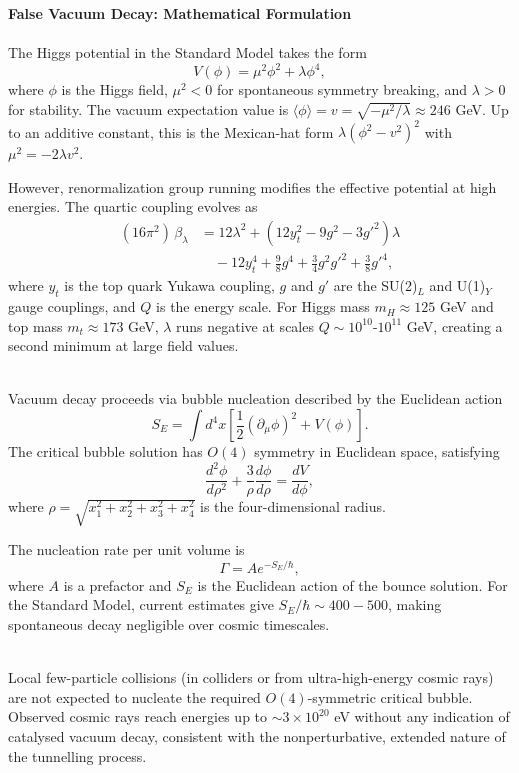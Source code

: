 \begin{technical}
{\Large\textbf{False Vacuum Decay: Mathematical Formulation}}\\[0.3em]

\\[0.5em]
The Higgs potential in the Standard Model takes the form
$$
V(\phi) = \mu^2 \phi^2 + \lambda \phi^4,
$$
where $\phi$ is the Higgs field, $\mu^2 < 0$ for spontaneous symmetry breaking, and $\lambda > 0$ for stability. The vacuum expectation value is $\langle \phi \rangle = v = \sqrt{-\mu^2/\lambda} \approx 246$ GeV. Up to an additive constant, this is the Mexican-hat form $\lambda(\phi^2 - v^2)^2$ with $\mu^2 = -2\lambda v^2$.

However, renormalization group running modifies the effective potential at high energies. The quartic coupling evolves as
\begin{align*}
(16\pi^2)\,\beta_\lambda &= 12\lambda^2 + (12 y_t^2 - 9 g^2 - 3 g'^2)\lambda \\
&\quad - 12 y_t^4 + \frac{9}{8} g^4 + \frac{3}{4} g^2 g'^2 + \frac{3}{8} g'^4,
\end{align*}
where $y_t$ is the top quark Yukawa coupling, $g$ and $g'$ are the SU(2)$ _L$ and U(1)$ _Y$ gauge couplings, and $Q$ is the energy scale. For Higgs mass $m_H \approx 125$ GeV and top mass $m_t \approx 173$ GeV, $\lambda$ runs negative at scales $Q \sim 10^{10}$-$10^{11}$ GeV, creating a second minimum at large field values.

\\[0.5em]
Vacuum decay proceeds via bubble nucleation described by the Euclidean action
$$
S_E = \int d^4x \left[\frac{1}{2}(\partial_\mu \phi)^2 + V(\phi)\right].
$$
The critical bubble solution has $O(4)$ symmetry in Euclidean space, satisfying
$$
\frac{d^2\phi}{d\rho^2} + \frac{3}{\rho}\frac{d\phi}{d\rho} = \frac{dV}{d\phi},
$$
where $\rho = \sqrt{x_1^2 + x_2^2 + x_3^2 + x_4^2}$ is the four-dimensional radius.

The nucleation rate per unit volume is
$$
\Gamma = A e^{-S_E/\hbar},
$$
where $A$ is a prefactor and $S_E$ is the Euclidean action of the bounce solution. For the Standard Model, current estimates give $S_E/\hbar \sim 400-500$, making spontaneous decay negligible over cosmic timescales.

\\[0.5em]
Local few-particle collisions (in colliders or from ultra-high-energy cosmic rays) are not expected to nucleate the required $O(4)$-symmetric critical bubble. Observed cosmic rays reach energies up to $\sim 3\times 10^{20}$ eV without any indication of catalysed vacuum decay, consistent with the nonperturbative, extended nature of the tunnelling process.


\end{technical}
